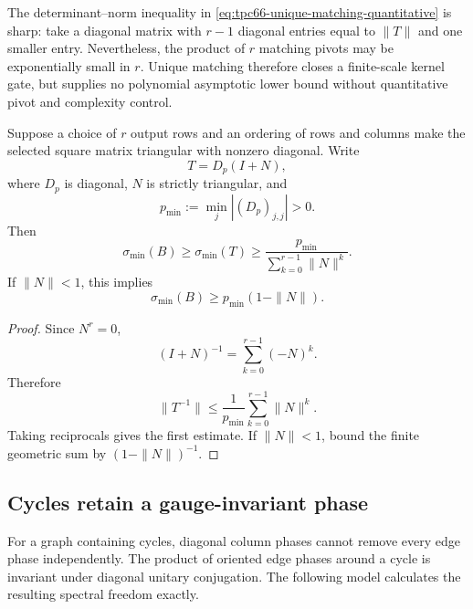 \begin{remark}
\label{rem:tpc66-matching-sharpness}
The determinant--norm inequality in
\eqref{eq:tpc66-unique-matching-quantitative} is sharp: take a diagonal
matrix with \(r-1\) diagonal entries equal to \(\|T\|\) and one smaller
entry.  Nevertheless, the product of \(r\) matching pivots may be
exponentially small in \(r\).  Unique matching therefore closes a
finite-scale kernel gate, but supplies no polynomial asymptotic lower bound
without quantitative pivot and complexity control.
\end{remark}

\begin{proposition}
\label{prop:tpc66-private-peeling}
Suppose a choice of \(r\) output rows and an ordering of rows and columns
make the selected square matrix triangular with nonzero diagonal.  Write
\[
 T=D_p(I+N),
 \]
where \(D_p\) is diagonal, \(N\) is strictly triangular, and
\[
 p_{\min}:=\min_j|(D_p)_{j,j}|>0.
\]
Then
\begin{equation}
 \boxed{
 \sigma_{\min}(B)
 \ge\sigma_{\min}(T)
 \ge
 \frac{p_{\min}}
      {\displaystyle\sum_{k=0}^{r-1}\|N\|^k}.}
 \label{eq:tpc66-peeling-inverse-bound}
\end{equation}
If \(\|N\|<1\), this implies
\begin{equation}
 \sigma_{\min}(B)\ge p_{\min}(1-\|N\|).
 \label{eq:tpc66-peeling-small-nilpotent}
\end{equation}
\end{proposition}

\begin{proof}
Since \(N^r=0\),
\[
 (I+N)^{-1}
 =\sum_{k=0}^{r-1}(-N)^k.
\]
Therefore
\[
 \|T^{-1}\|
 \le
 \frac{1}{p_{\min}}
 \sum_{k=0}^{r-1}\|N\|^k.
\]
Taking reciprocals gives the first estimate.  If \(\|N\|<1\), bound the
finite geometric sum by \((1-\|N\|)^{-1}\).
\end{proof}

\subsection{Cycles retain a gauge-invariant phase}

For a graph containing cycles, diagonal column phases cannot remove every
edge phase independently.  The product of oriented edge phases around a
cycle is invariant under diagonal unitary conjugation.  The following
model calculates the resulting spectral freedom exactly.

